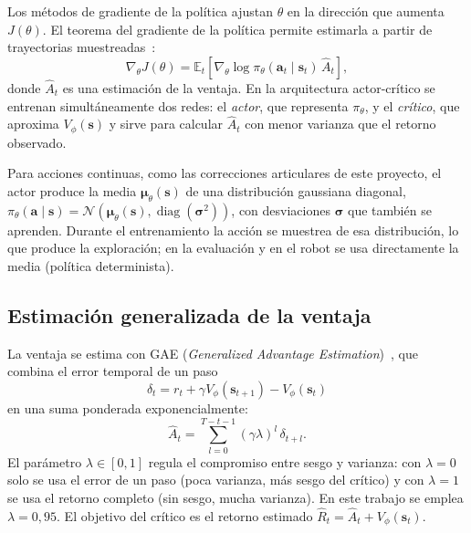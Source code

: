 Los métodos de gradiente de la política ajustan $\theta$ en la dirección que aumenta $J(\theta)$. El teorema del gradiente de la política permite estimarla a partir de trayectorias muestreadas~\cite{sutton2018rl}:
\begin{equation}
    \nabla_\theta J(\theta)=\mathbb{E}_{t}\left[\nabla_\theta\log\pi_\theta(\mathbf{a}_t\mid\mathbf{s}_t)\,\hat{A}_t\right],
    \label{eq:gradiente-politica}
\end{equation}
donde $\hat{A}_t$ es una estimación de la ventaja. En la arquitectura actor-crítico se entrenan simultáneamente dos redes: el \emph{actor}, que representa $\pi_\theta$, y el \emph{crítico}, que aproxima $V_\phi(\mathbf{s})$ y sirve para calcular $\hat{A}_t$ con menor varianza que el retorno observado.

Para acciones continuas, como las correcciones articulares de este proyecto, el actor produce la media $\boldsymbol{\mu}_\theta(\mathbf{s})$ de una distribución gaussiana diagonal, $\pi_\theta(\mathbf{a}\mid\mathbf{s})=\mathcal{N}(\boldsymbol{\mu}_\theta(\mathbf{s}),\operatorname{diag}(\boldsymbol{\sigma}^2))$, con desviaciones $\boldsymbol{\sigma}$ que también se aprenden. Durante el entrenamiento la acción se muestrea de esa distribución, lo que produce la exploración; en la evaluación y en el robot se usa directamente la media (política determinista).

\subsection{Estimación generalizada de la ventaja}

La ventaja se estima con GAE (\emph{Generalized Advantage Estimation})~\cite{schulman2016gae}, que combina el error temporal de un paso
\begin{equation}
    \delta_t=r_t+\gamma V_\phi(\mathbf{s}_{t+1})-V_\phi(\mathbf{s}_t)
\end{equation}
en una suma ponderada exponencialmente:
\begin{equation}
    \hat{A}_t=\sum_{l=0}^{T-t-1}(\gamma\lambda)^{l}\,\delta_{t+l}.
    \label{eq:gae}
\end{equation}
El parámetro $\lambda\in[0,1]$ regula el compromiso entre sesgo y varianza: con $\lambda=0$ solo se usa el error de un paso (poca varianza, más sesgo del crítico) y con $\lambda=1$ se usa el retorno completo (sin sesgo, mucha varianza). En este trabajo se emplea $\lambda=0{,}95$. El objetivo del crítico es el retorno estimado $\hat{R}_t=\hat{A}_t+V_\phi(\mathbf{s}_t)$.

